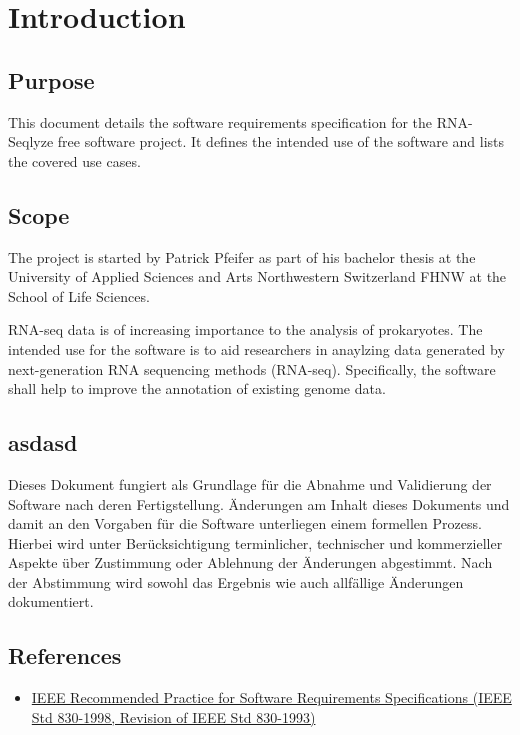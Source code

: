 \documentclass[a4paper,draftmode]{srs}
\begin{document}

\tableofcontents
\newpage

	\section{Introduction}

\subsection{Purpose}
This document details the software requirements specification for the RNA-Seqlyze free software project. It defines the intended use of the software and lists the covered use cases.

\subsection{Scope}

The project is started by Patrick Pfeifer as part of his bachelor thesis at the University of Applied Sciences and Arts Northwestern 
Switzerland FHNW at the School of Life Sciences.

RNA-seq data is of increasing importance to the analysis of prokaryotes. The intended use for the software is to aid researchers in anaylzing data generated by next-generation RNA sequencing methods (RNA-seq). Specifically, the software shall help to improve the annotation of existing genome data.

\subsection{asdasd}

Dieses Dokument fungiert als Grundlage für die Abnahme und Validierung der Software nach deren Fertigstellung. Änderungen am Inhalt dieses Dokuments und damit an den Vorgaben für die Software unterliegen einem formellen Prozess. Hierbei wird unter Berücksichtigung terminlicher, technischer und kommerzieller Aspekte über Zustimmung oder Ablehnung der Änderungen abgestimmt. Nach der Abstimmung wird sowohl das Ergebnis wie auch allfällige Änderungen dokumentiert.


\subsection{References}
\begin{itemize}
\item \href{http://standards.ieee.org/findstds/standard/830-1998.html}{
	IEEE Recommended Practice for Software Requirements Specifications
	(IEEE Std 830-1998, Revision of IEEE Std 830-1993)}
\end{itemize}
\end{document}
